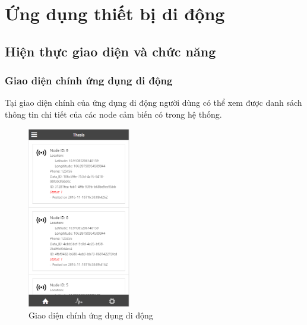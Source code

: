 \section{Ứng dụng thiết bị di động}




\subsection{Hiện thực giao diện và chức năng}
\subsubsection*{Giao diện chính ứng dụng di động}
Tại giao diện chính của ứng dụng di động người dùng có thể xem được danh sách thông tin chi tiết của các node cảm biến có trong hệ thống.
\begin{center}
\begin{figure}[htp]
\centering    
\includegraphics[width=0.4\textwidth]{app_main}
\caption[Giao diện chính ứng dụng di động]{Giao diện chính ứng dụng di động}
\label{fig:app_main}
\end{figure}
\end{center}


